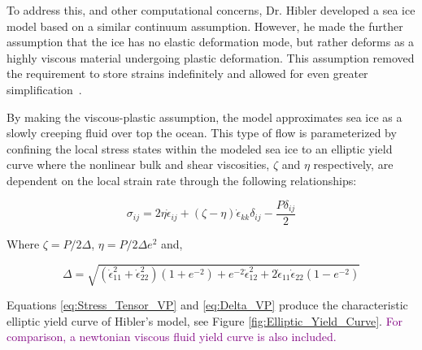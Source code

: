 To address this, and other computational concerns, Dr. Hibler developed a sea ice model based on a similar continuum assumption.  However, he made the further assumption that the ice has no elastic deformation mode, but rather deforms as a highly viscous material undergoing plastic deformation.  This assumption removed the requirement to store strains indefinitely and allowed for even greater simplification~\citet{Hibler1979}.

By making the viscous-plastic assumption, the model approximates sea ice as a slowly creeping fluid over top the ocean.  This type of flow is parameterized by confining the local stress states within the modeled sea ice to an elliptic yield curve where the nonlinear bulk and shear viscosities, $\zeta$ and $\eta$ respectively, are dependent on the local strain rate through the following relationships:

\begin{equation}
\sigma_{ij}=2\eta\dot{\epsilon}_{ij}+(\zeta-\eta)\dot{\epsilon}_{kk}\delta_{ij}-\frac{P\delta_{ij}}{2}
\label{eq:Stress_Tensor_VP}
\end{equation}

Where $\zeta = P/2\Delta$, $\eta=P/2\Delta e^2$ and,

\begin{equation}
\Delta=\sqrt{\left(\dot{\epsilon}_{11}^2+\dot{\epsilon}_{22}^2\right)(1+e^{-2})+e^{-2}\dot{\epsilon}_{12}^2+2\dot{\epsilon}_{11}\dot{\epsilon}_{22}(1-e^{-2})}
\label{eq:Delta_VP}
\end{equation}

Equations \ref{eq:Stress_Tensor_VP} and \ref{eq:Delta_VP} produce the characteristic elliptic yield curve of Hibler's model, see Figure \ref{fig:Elliptic_Yield_Curve}.  \textcolor{purple}{For comparison, a newtonian viscous fluid yield curve is also included.}

